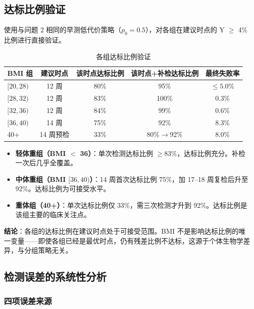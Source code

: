 \documentclass{mcm-paper}
\begin{document}
\subsection{达标比例验证}

使用与问题 2 相同的早测低代价策略（$p_0=0.5$），对各组在建议时点的 Y $\geq$ 4\% 比例进行直接验证。

\begin{table}[H]
\centering
\caption{各组达标比例验证}
\begin{tabular}{lcccc}
\toprule
BMI 组 & 建议时点 & 该时点达标比例 & 该时点+补检达标比例 & 最终失败率 \\
\midrule
$[20,28)$   & 12 周 & 80\% & 95\% & $\leq 5.0\%$ \\
$[28,32)$   & 12 周 & 83\% & 100\% & 0.3\% \\
$[32,36)$  & 12 周 & 84\% & 99\% & 0.6\% \\
$[36,40)$ & 14 周 & 75\% & 92\% & 8.3\% \\
40+    & 14 周预检 & 33\% & 80\%$\to$92\% & 8.0\% \\
\bottomrule
\end{tabular}
\end{table}

\begin{itemize}
    \item \textbf{轻体重组（BMI $<$ 36）}：单次检测达标比例 $\geq 83\%$，达标比例充分。补检一次后几乎全覆盖。
    \item \textbf{中体重组（BMI $[36,40)$）}：14 周首次达标比例 75\%，加 17--18 周复检后升至 92\%。达标比例为可接受水平。
    \item \textbf{重体组（40+）}：单次达标比例仅 33\%，需三次检测才升到 92\%。达标比例是该组主要的临床关注点。
\end{itemize}

\textbf{结论}：各组的达标比例在建议时点处于可接受范围。BMI 不是影响达标比例的唯一变量——即使各组已经是最优时点，仍有残差比例不达标，这源于个体生物学差异，与分组策略无关。

\subsection{检测误差的系统性分析}

\subsubsection{四项误差来源}
\end{document}

